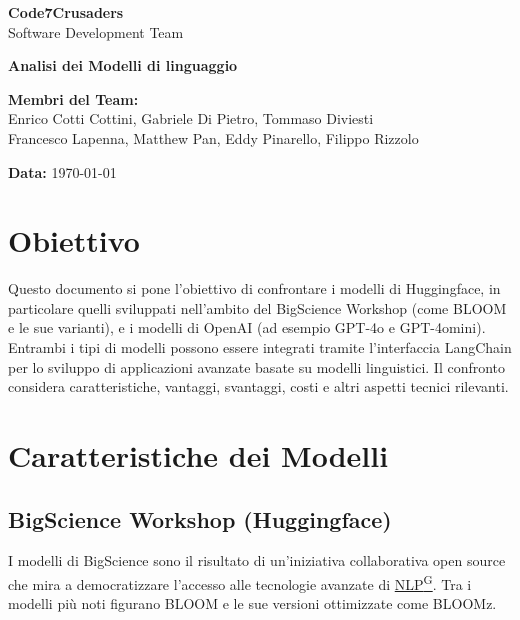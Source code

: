 \documentclass{article}
\begin{document}
\begin{titlepage}
    {\Huge \textbf{Code7Crusaders}}\\
    \vspace{0.5cm}
    {\Large Software Development Team}\\
    \vspace{2cm}
    
    {\large \textbf{Analisi dei Modelli di linguaggio}}\\
    \vspace{5cm}

    \textbf{Membri del Team:}\\
    Enrico Cotti Cottini, Gabriele Di Pietro, Tommaso Diviesti \\
    Francesco Lapenna, Matthew Pan, Eddy Pinarello, Filippo Rizzolo \\
    \vspace{0.5cm}
    
    {\large \textbf{Data:}} \today\\
    
    \vspace{1cm}
\end{titlepage}

\newpage
\tableofcontents
\newpage

\newpage
\listoffigures
\newpage

\section{Obiettivo}
Questo documento si pone l'obiettivo di confrontare i modelli di Huggingface, in particolare quelli sviluppati nell'ambito del BigScience Workshop (come BLOOM e le sue varianti), e i modelli di OpenAI (ad esempio GPT-4o e GPT-4omini). Entrambi i tipi di modelli possono essere integrati tramite l'interfaccia LangChain per lo sviluppo di applicazioni avanzate basate su modelli linguistici. Il confronto considera caratteristiche, vantaggi, svantaggi, costi e altri aspetti tecnici rilevanti.

\section{Caratteristiche dei Modelli}

\subsection{BigScience Workshop (Huggingface)}
I modelli di BigScience sono il risultato di un'iniziativa collaborativa open source che mira a democratizzare l'accesso alle tecnologie avanzate di \href{https://code7crusaders.github.io/docs/RTB/documentazione_interna/glossario.html#natural-language-processing-nlp}{NLP\textsuperscript{G}}. Tra i modelli più noti figurano BLOOM e le sue versioni ottimizzate come BLOOMz.
\end{document}
